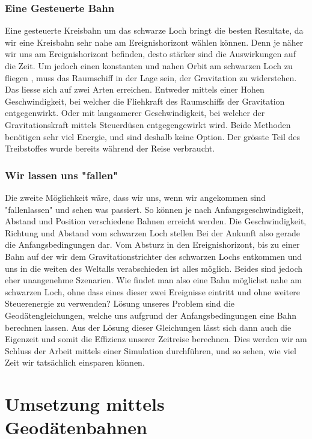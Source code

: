 \begin{refsection}
	\subsubsection{Eine Gesteuerte Bahn}
	Eine gesteuerte Kreisbahn um das schwarze Loch bringt die besten Resultate, da wir eine Kreisbahn sehr nahe am Ereignishorizont wählen können. Denn je näher wir uns am Ereignishorizont befinden, desto stärker sind die Auswirkungen auf die Zeit. 
	Um jedoch einen konstanten und nahen Orbit am schwarzen Loch zu fliegen , muss das Raumschiff in der Lage sein, der Gravitation zu widerstehen. Das liesse sich auf zwei Arten erreichen. Entweder mittels einer Hohen Geschwindigkeit, bei welcher die Fliehkraft des Raumschiffs der Gravitation entgegenwirkt. Oder mit langsamerer Geschwindigkeit, bei welcher der Gravitationskraft mittels Steuerdüsen entgegengewirkt wird. 
	Beide Methoden benötigen sehr viel Energie, und sind deshalb keine Option. Der grösste Teil des Treibstoffes wurde bereits während der Reise  verbraucht.
	\subsubsection{Wir lassen uns "fallen"}
	
	Die zweite Möglichkeit wäre, dass wir uns, wenn wir angekommen sind "fallenlassen" und sehen was passiert. So können je nach Anfangsgeschwindigkeit, Abstand und Position verschiedene Bahnen erreicht werden. Die Geschwindigkeit, Richtung und Abstand vom schwarzen Loch stellen Bei der Ankunft also gerade die Anfangsbedingungen dar. Vom Absturz in den Ereignishorizont, bis zu einer Bahn auf der wir dem Gravitationstrichter des schwarzen Lochs entkommen und uns in die weiten des Weltalls verabschieden ist alles möglich. Beides sind jedoch eher unangenehme Szenarien. 
	Wie findet man also eine Bahn möglichst nahe am schwarzen Loch, ohne dass eines dieser zwei Ereignisse eintritt und ohne weitere Steuerenergie zu verwenden?
	Lösung unseres Problem sind die Geodätengleichungen, welche uns aufgrund der Anfangsbedingungen eine Bahn berechnen lassen. Aus der Lösung dieser Gleichungen lässt sich dann auch die Eigenzeit und somit die Effizienz unserer Zeitreise berechnen. Dies werden wir am Schluss der Arbeit mittels einer Simulation durchführen, und so sehen, wie viel Zeit wir tatsächlich einsparen können.
	
	\section{Umsetzung mittels Geodätenbahnen}
	

\end{refsection}
